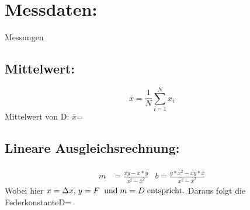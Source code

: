 \section{Messdaten:} 
    
\begin{table}
    \centering
     
    \caption{Messungen}
    \label{tab:data}
\end{table}
\newpage
    \subsection{Mittelwert:}
    \begin{equation}\label{eq.mean}
        \overline{x} = \frac{1}{N}\sum\limits_{i=1}^{N} x_i
    \end{equation}
    Mittelwert von D: $\overline{x}$\:=\:

    \subsection{Lineare Ausgleichsrechnung:}
    \begin{align}\label{eq.linreg}
        m &= \frac{\overline{xy}-\overline{x}* \overline{y}}{\overline{x^2}-\overline{x}^2} 
        &b = \frac{\overline{y}* \overline{x^2}-\overline{xy}* \overline{x}}{\overline{x^2}- \overline{x}^2}
    \end{align}
    Wobei hier$\; x = \Delta x \text{,} \; y=F \;\;\text{und}\; m = D \text{\;entspricht.}\\$
    Daraus folgt die Federkonstante\:D\:=\:

    
    

